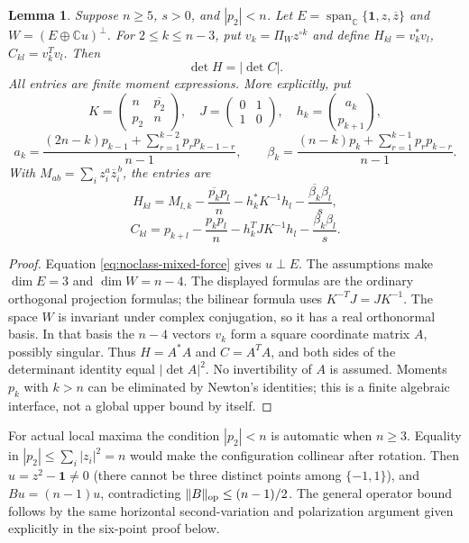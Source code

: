 \documentclass[11pt]{article}
\newtheorem{lemma}[theorem]{Lemma}
\theoremstyle{remark}
\numberwithin{equation}{section}
\begin{document}
\begin{lemma}\label{lem:noclass-finite-projection}
Suppose $n\ge5$, $s>0$, and $|p_2|<n$. Let
$E=\operatorname{span}_{\mathbb C}\{\mathbf1,z,\overline z\}$ and
$W=(E\oplus\mathbb C u)^\perp$. For $2\le k\le n-3$, put
$v_k=\Pi_W z^{\circ k}$ and define
$H_{kl}=v_k^*v_l$, $C_{kl}=v_k^Tv_l$. Then
\[
                         \det H=|\det C|.
\]
All entries are finite moment expressions. More explicitly, put
\[
 K=\begin{pmatrix}n&\overline{p_2}\\p_2&n\end{pmatrix},
 \quad J=\begin{pmatrix}0&1\\1&0\end{pmatrix},
 \quad h_k=\binom{a_k}{p_{k+1}},
\]
\[
 a_k=\frac{(2n-k)p_{k-1}+
                 \sum_{r=1}^{k-2}p_rp_{k-1-r}}{n-1},\qquad
 \beta_k=\frac{(n-k)p_k+
                 \sum_{r=1}^{k-1}p_rp_{k-r}}{n-1}.
\]
With $M_{ab}=\sum_i z_i^a\overline z_i^{\,b}$, the entries are
\[
 H_{kl}=M_{l,k}-\frac{\overline{p_k}p_l}{n}
          -h_k^*K^{-1}h_l-\frac{\overline{\beta_k}\beta_l}{s},
\]
\[
 C_{kl}=p_{k+l}-\frac{p_kp_l}{n}
          -h_k^TJK^{-1}h_l-\frac{\beta_k\beta_l}{s}.
\]
\end{lemma}
\begin{proof}
Equation \eqref{eq:noclass-mixed-force} gives $u\perp E$.
The assumptions make $\dim E=3$ and $\dim W=n-4$.
The displayed formulas are the ordinary orthogonal projection
formulas; the bilinear formula uses $K^{-T}J=JK^{-1}$.
The space $W$ is invariant under complex conjugation, so it has a
real orthonormal basis. In that basis the $n-4$ vectors $v_k$ form a
square coordinate matrix $A$, possibly singular. Thus $H=A^*A$ and
$C=A^TA$, and both sides of the determinant identity equal
$|\det A|^2$. No invertibility of $A$ is assumed.
Moments $p_k$ with $k>n$ can be eliminated by Newton's identities;
this is a finite algebraic interface, not a global upper bound by itself.
\end{proof}

For actual local maxima the condition $|p_2|<n$ is automatic when
$n\ge3$. Equality in $|p_2|\le\sum_i|z_i|^2=n$ would make the
configuration collinear after rotation. Then $u=z^2-\mathbf1\ne0$
(there cannot be three distinct points among $\{-1,1\}$), and
$Bu=(n-1)u$, contradicting $\|B\|_{\rm op}\le(n-1)/2$.
The general operator bound follows by the same horizontal
second-variation and polarization argument given explicitly in
the six-point proof below.
\end{document}
